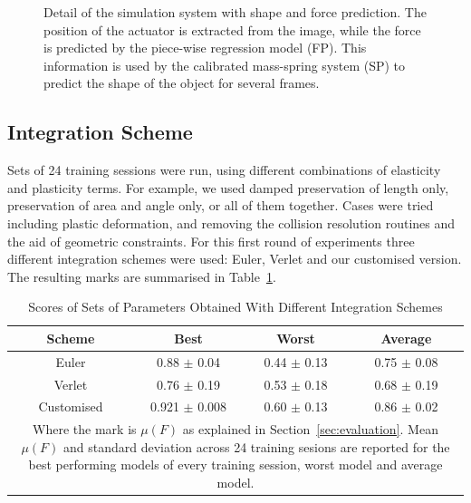 \documentclass[journal]{IEEEtran}
\newcommand{\tref}[1]{Table~\ref{#1}}
\newcommand{\sref}[1]{Section~\ref{#1}}
\newcommand{\comment}[1]{{\color{red} #1}}
\begin{document}
\begin{figure}[!t]
\centering
\setlength\fboxsep{0pt}    %
\setlength\fboxrule{0.5pt} %
\caption{Detail of the simulation system with shape and force prediction.  The position of the actuator is extracted from the image, while the force is predicted by the piece-wise regression model (FP). This information is used by the calibrated mass-spring system (SP) to predict the shape of the object for several frames. }\label{fig:diagram}
\end{figure}

\subsection{Integration Scheme}
Sets of 24 training sessions were run, using different combinations of elasticity and plasticity terms.  For example, we used damped preservation of length only, preservation of area and angle only, or all of them together. Cases were tried including plastic deformation, and removing the collision resolution routines and the aid of geometric constraints.  For this first round of experiments three different integration schemes were used: Euler, Verlet and our customised version.  The resulting marks are summarised in \tref{tab:ischemes}.

\begin{table}[!t]
\renewcommand{\arraystretch}{1.3}
\caption{Scores of Sets of Parameters Obtained With Different Integration Schemes}
\label{tab:ischemes}
\centering
\begin{tabular}{cccc}
\hline
\bfseries Scheme & \bfseries Best & \bfseries Worst & \bfseries Average \\
\hline\hline
Euler & 0.88 $\pm$ 0.04 & 0.44 $\pm$ 0.13 & 0.75 $\pm$ 0.08 \\
Verlet & 0.76 $\pm$ 0.19 & 0.53 $\pm$ 0.18 & 0.68 $\pm$ 0.19 \\
Customised & 0.921 $\pm$ 0.008 & 0.60 $\pm$ 0.13 & 0.86 $\pm$ 0.02 \\
\hline
\multicolumn{4}{p{88mm}}{Where the mark is $\mu(F)$ as explained in \sref{sec:evaluation}.  \comment{Mean $\mu(F)$ and standard deviation across 24 training sesions are reported for the best performing models of every training session, worst model and average model.}}
\end{tabular}
\end{table}
\end{document}
